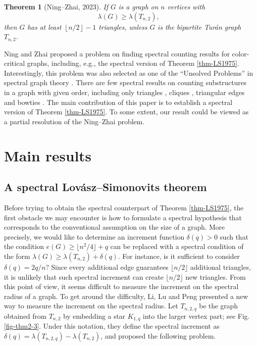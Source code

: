 \documentclass[11pt]{article}
\newtheorem{theorem}{Theorem}[section]
\begin{document}
\begin{theorem}[Ning--Zhai, 2023] \label{thmNZ2021}
If $G$ is a graph on $n$ vertices with 
\[   \lambda (G) \ge \lambda (T_{n,2}), \]  
then  $G$ has at least 
$\left\lfloor {n}/{2}\right\rfloor -1 $ triangles, 
unless $G$ is the bipartite Tur\'{a}n graph $T_{n,2}$.  
\end{theorem} 


Ning and Zhai \cite{NZ2021} 
 proposed a problem on finding spectral counting results 
 for color-critical graphs, including, e.g., the spectral version of Theorem \ref{thm-LS1975}. 
Interestingly, this problem was also selected as one of the ``Unsolved Problems'' in spectral graph theory \cite[Sec. 9]{LN2023-unsolved}. 
There are  few spectral results on counting substructures in a graph with given order, 
including only triangles \cite{NZ2021}, cliques \cite{BN2007jctb}, 
triangular edges \cite{LFP2024-triangular} 
and bowties \cite{LFP-count-bowtie}. 
The main contribution of this paper is to establish
 a spectral version of Theorem \ref{thm-LS1975}. 
To some extent, 
our result could be viewed as a partial 
resolution of the Ning--Zhai problem.  



\section{Main results}


\subsection{A spectral  Lov\'{a}sz--Simonovits theorem}

Before trying to obtain the spectral counterpart of Theorem \ref{thm-LS1975}, the first obstacle we may encounter is how to formulate a spectral hypothesis that corresponds to the conventional assumption on the size of a graph. 
More precisely, 
we would like to determine an increment function $\delta(q)>0$ 
such that the condition $e(G)\ge \lfloor n^2/4 \rfloor +q$ can be replaced with a spectral condition of the form $\lambda (G)\ge \lambda (T_{n,2}) + \delta (q)$.  
For instance, is it sufficient to consider $\delta (q) =2q/n$?   
Since every additional edge guarantees $\lfloor n/2 \rfloor$ additional triangles, it is unlikely that 
such spectral increment can create $\lfloor n/2 \rfloor$ 
new triangles. 
From this point of view, it seems difficult to measure the increment on the spectral radius of a graph. 
To get around the difficulty, 
Li, Lu and Peng \cite{LLP2024-AAM} presented a new way to measure the increment on the spectral radius.    
Let $T_{n,2,q}$ be the graph obtained from
$T_{n,2}$ by embedding a star $K_{1,q}$ into the larger vertex part; see Fig. \ref{fig-thm2-3}.  
Under this notation, they define the spectral increment 
as $\delta (q) = \lambda (T_{n,2,q}) - \lambda (T_{n,2})$,  and proposed the following problem.  
\end{document}
